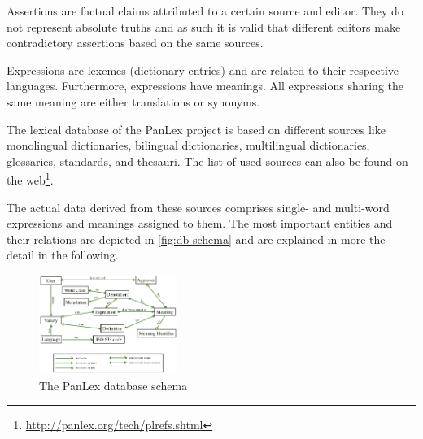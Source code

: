 \documentclass[sw]{iosart2c}
\begin{document}
Assertions are factual claims attributed to a certain source and editor.
They do not represent absolute truths and as such it is valid that different editors make contradictory assertions based on the same sources.

Expressions are lexemes (dictionary entries) and are related to their respective languages.
Furthermore, expressions have meanings. All expressions sharing the same meaning are either translations or synonyms. 

The lexical database of the PanLex project is based on different sources like monolingual dictionaries,
bilingual dictionaries, multilingual dictionaries, glossaries, standards, and thesauri.
The list of used sources can also be found on the web\footnote{\url{http://panlex.org/tech/plrefs.shtml}}.

The actual data derived from these sources comprises single- and multi-word expressions and meanings assigned to them.
The most important entities and their relations are depicted in \autoref{fig:db-schema} and are explained in more the detail in the following.

\begin{figure}
\centering
\includegraphics[width=0.4\textwidth]{images/schema.png}
\caption{The PanLex database schema}
\label{fig:db-schema}
\end{figure}
\end{document}

